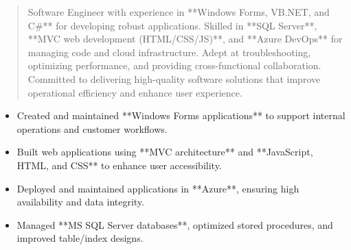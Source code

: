 



\makecvheader

\begin{quote}
  \noindent
  Software Engineer with experience in **Windows Forms, VB.NET, and C#** for developing robust applications. Skilled in **SQL Server**, **MVC web development (HTML/CSS/JS)**, and **Azure DevOps** for managing code and cloud infrastructure. Adept at troubleshooting, optimizing performance, and providing cross-functional collaboration. Committed to delivering high-quality software solutions that improve operational efficiency and enhance user experience.
\end{quote}

\par\smallskip
\noindent
\begin{minipage}{20cm}
  \begin{minipage}{9.75cm}
    \begin{itemize}
      \item Created and maintained **Windows Forms applications** to support internal operations and customer workflows.
      \item Built web applications using **MVC architecture** and **JavaScript, HTML, and CSS** to enhance user accessibility.
    \end{itemize}
  \end{minipage}
  \hfill
  \begin{minipage}{9.75cm}
    \begin{itemize}
      \item Deployed and maintained applications in **Azure**, ensuring high availability and data integrity.
      \item Managed **MS SQL Server databases**, optimized stored procedures, and improved table/index designs.
    \end{itemize}
  \end{minipage}
\end{minipage}
\par\smallskip
\divider

